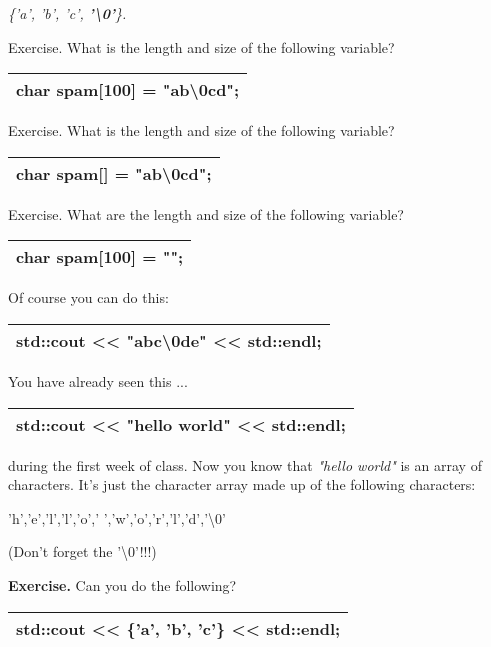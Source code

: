 \documentclass[
]{article}
\begin{document}
\emph{\{'a', 'b', 'c', \textbf{'\textbackslash0'}\}.}

Exercise. What is the length and size of the following variable?

\begin{longtable}[]{@{}l@{}}
\toprule
\endhead
char spam{[}100{]} = "ab\textbackslash0cd";\tabularnewline
\bottomrule
\end{longtable}

Exercise. What is the length and size of the following variable?

\begin{longtable}[]{@{}l@{}}
\toprule
\endhead
char spam{[}{]} = "ab\textbackslash0cd";\tabularnewline
\bottomrule
\end{longtable}

Exercise. What are the length and size of the following variable?

\begin{longtable}[]{@{}l@{}}
\toprule
\endhead
char spam{[}100{]} = "";\tabularnewline
\bottomrule
\end{longtable}

Of course you can do this:

\begin{longtable}[]{@{}l@{}}
\toprule
\endhead
std::cout \textless\textless{} \textbf{"abc\textbackslash0de"}
\textless\textless{} std::endl;\tabularnewline
\bottomrule
\end{longtable}

You have already seen this ...

\begin{longtable}[]{@{}l@{}}
\toprule
\endhead
std::cout \textless\textless{} "hello world" \textless\textless{}
std::endl;\tabularnewline
\bottomrule
\end{longtable}

during the first week of class. Now you know that \emph{"hello world"}
is an array of characters. It's just the character array made up of the
following characters:

'h','e','l','l','o',' ','w','o','r','l','d','\textbackslash0'

(Don't forget the '\textbackslash0'!!!)

\textbf{Exercise.} Can you do the following?

\begin{longtable}[]{@{}l@{}}
\toprule
\endhead
std::cout \textless\textless{} \{'a', 'b', 'c'\} \textless\textless{}
std::endl;\tabularnewline
\bottomrule
\end{longtable}
\end{document}
